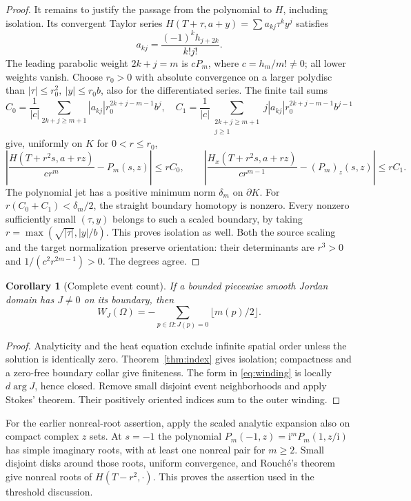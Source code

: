 \documentclass[11pt]{article}
\newtheorem{corollary}[theorem]{Corollary}
\theoremstyle{definition}
\newcommand{\ii}{\mathrm i}
\begin{document}
\begin{proof}
It remains to justify the passage from the polynomial to \(H\), including
isolation. Its convergent Taylor series
\(H(T+\tau,a+y)=\sum a_{kj}\tau^ky^j\) satisfies
\[
 a_{kj}=\frac{(-1)^kh_{j+2k}}{k!j!}.
\]
The leading parabolic weight \(2k+j=m\) is \(cP_m\), where
\(c=h_m/m!\ne0\); all lower weights vanish.
Choose \(r_0>0\) with absolute convergence on a larger polydisc than
\(|\tau|\le r_0^2,\ |y|\le r_0b\), also for the differentiated series.
The finite tail sums
\[
 C_0=\frac1{|c|}\sum_{2k+j\ge m+1}|a_{kj}|r_0^{2k+j-m-1}b^j,\quad
 C_1=\frac1{|c|}\sum_{\substack{2k+j\ge m+1\\j\ge1}}
                 j|a_{kj}|r_0^{2k+j-m-1}b^{j-1}
\]
give, uniformly on \(K\) for \(0<r\le r_0\),
\[
 \left|\frac{H(T+r^2s,a+rz)}{cr^m}-P_m(s,z)\right|\le rC_0,\qquad
 \left|\frac{H_x(T+r^2s,a+rz)}{cr^{m-1}}-(P_m)_z(s,z)\right|
 \le rC_1.
\]
The polynomial jet has a positive minimum norm \(\delta_m\) on
\(\partial K\). For \(r(C_0+C_1)<\delta_m/2\), the straight boundary
homotopy is nonzero. Every nonzero sufficiently small \((\tau,y)\)
belongs to such a scaled boundary, by taking
\(r=\max(\sqrt{|\tau|},|y|/b)\). This proves isolation as well.
Both the source scaling and the target normalization preserve
orientation: their determinants are \(r^3>0\) and
\(1/(c^2r^{2m-1})>0\). The degrees agree.
\end{proof}

\begin{corollary}[Complete event count]\label{cor:count}
If a bounded piecewise smooth Jordan domain has \(J\ne0\) on its boundary,
then
\begin{equation}
 W_J(\Omega)=-\sum_{p\in\Omega:J(p)=0}\lfloor m(p)/2\rfloor .
                                                        \label{eq:count}
\end{equation}
\end{corollary}
\begin{proof}
Analyticity and the heat equation exclude infinite spatial order unless
the solution is identically zero. Theorem~\ref{thm:index} gives isolation;
compactness and a zero-free boundary collar give finiteness. The form in
\eqref{eq:winding} is locally \(d\arg J\), hence closed. Remove small
disjoint event neighborhoods and apply Stokes' theorem. Their positively
oriented indices sum to the outer winding.
\end{proof}

For the earlier nonreal-root assertion, apply the scaled analytic
expansion also on compact complex \(z\) sets. At \(s=-1\) the
polynomial \(P_m(-1,z)=\ii^mP_m(1,z/\ii)\) has simple imaginary roots,
with at least one nonreal pair for \(m\ge2\).
Small disjoint disks around those roots, uniform convergence, and
Rouch\'e's theorem give nonreal roots of \(H(T-r^2,\cdot)\).
This proves the assertion used in the threshold discussion.
\end{document}
